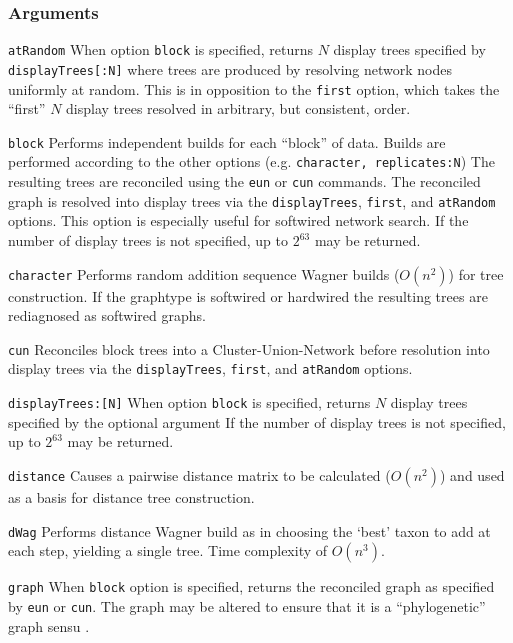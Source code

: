 \documentclass[11pt]{article}
\begin{document}
		\subsubsection{Arguments}
		\noindent \texttt{atRandom} When option \texttt{block} is specified, returns $N$ display trees specified by \texttt{displayTrees[:N]} where trees are produced by 
		resolving network nodes uniformly at random.  This is in opposition to the \texttt{first} option, which takes the ``first'' $N$ display trees  resolved in arbitrary, but consistent, order.
		
		\smallskip
		\noindent \texttt{block} Performs independent builds for each ``block'' of data.  Builds are performed according to the other options (e.g. \texttt{character, replicates:N})
		The resulting trees are reconciled using the \texttt{eun} or \texttt{cun} commands.   The reconciled graph is resolved into display trees via the \texttt{displayTrees}, \texttt{first},
		and \texttt{atRandom} options.  This option is especially useful for softwired  network search.  If the number of display trees is not specified, up to  $2^{63}$ may be returned.
		
		\smallskip
		\noindent \texttt{character} Performs random addition sequence Wagner \citep{Farris1970} builds ($O(n^2)$) for tree construction.  If the graphtype is softwired  or hardwired
		the resulting trees are rediagnosed as softwired graphs.
		
		\smallskip
		\noindent \texttt{cun} Reconciles block trees into a  Cluster-Union-Network \citep{Baroni2005} before resolution into display trees via the \texttt{displayTrees}, \texttt{first},
		and \texttt{atRandom} options.
		
		\smallskip
		\noindent \texttt{displayTrees:[N]} When option \texttt{block} is specified, returns $N$ display trees specified by the optional argument  If the number of display trees is not specified, up to  $2^{63}$ may be returned.
	
		\smallskip
		\noindent \texttt{distance} Causes a pairwise distance matrix to be calculated ($O(n^2)$) and used as a basis for distance tree construction.
		
		\smallskip
		\noindent \texttt{dWag} Performs distance Wagner build as in \citep{Farris1972} choosing the `best' taxon to add at each step, 
		yielding a single tree.  Time complexity of $O(n^3)$.
		
		\noindent \texttt{graph} When \texttt{block} option  is specified, returns the reconciled graph as specified by \texttt{eun} or \texttt{cun}.  The graph may be altered to
		ensure that it is a ``phylogenetic'' graph sensu \cite{Moretetal2005}.
		
\end{document}
